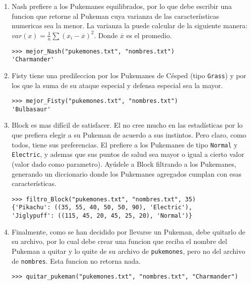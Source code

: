 \begin{enumerate}
	\item Nash prefiere a los Pukemanes equilibrados, por lo que debe escribir una funcion que retorne al Pukeman cuya varianza de las caracteríısticas numericas sea la menor. La varianza la puede calcular de la siguiente manera: $var(x) = \frac{1}{n}\sum{(x_{i} - \overbar{x})^2}$. Donde $\overbar{x}$ es el promedio.

	\begin{lstlisting}[style=consola]
>>> mejor_Nash("pukemones.txt", "nombres.txt")
'Charmander'
	\end{lstlisting}

	\item Fisty tiene una predileccion por los Pukemanes de Césped (tipo \texttt{Grass}) y por los que la suma de su ataque especial y defensa especial sea la mayor.

	\begin{lstlisting}[style=consola]
>>> mejor_Fisty("pukemones.txt", "nombres.txt")
'Bulbasaur'
	\end{lstlisting}

	\item Block es mas difícil de satisfacer. El no cree mucho en las estadísticas por lo que prefiera elegir a su Pukeman de acuerdo a sus instintos. Pero claro, como todos, tiene sus preferencias. El prefiere a los Pukemanes de tipo \texttt{Normal} y \texttt{Electric}, y ademas que sus puntos de salud sea mayor o igual a cierto valor (valor dado como parametro). Ayúdele a Block filtrando a los Pukemanes, generando un diccionario donde los Pukemanes agregados cumplan con esas características.

	\begin{lstlisting}[style=consola]
>>> filtro_Block("pukemones.txt", "nombres.txt", 35)
{'Pikachu': ((35, 55, 40, 50, 50, 90), 'Electric'),
'Jiglypuff': ((115, 45, 20, 45, 25, 20), 'Normal')}
	\end{lstlisting}

	\item Finalmente, como se han decidido por llevarse un Pukeman, debe quitarlo de su archivo, por lo cual debe crear una funcion que reciba el nombre del Pukeman a quitar y lo quite de su archivo de \texttt{pukemones}, pero no del archivo de \texttt{nombres}. Esta funcion no retorna nada.

	\begin{lstlisting}[style=consola]
>>> quitar_pukeman("pukemones.txt", "nombres.txt", "Charmander")
	\end{lstlisting}

\end{enumerate}
